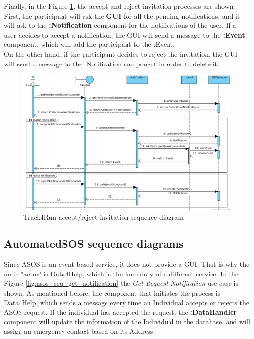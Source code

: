 \documentclass[a4paper, hidelinks, 12pt]{report}
\begin{document}
	Finally, in the Figure \ref{fig:t4r_seq_accept_invitation}, the accept and reject invitation processes are shown. First, the participant will ask the \textbf{GUI} for all the pending notifications, and it will ask to the \textbf{:Notification} component for the notifications of the user. If a user decides to accept a notification, the GUI will send a message to the \textbf{:Event} component, which will add the participant to the :Event.\\

	 On the other hand, if the participant decides to reject the invitation, the GUI will send a message to the :Notification component in order to delete it.\\
	 
	\begin{figure}[H]
		\centering
		\includegraphics[width=1\textwidth]{diagrams/sequence_diagrams/t4r_accept_reject_notification.png}
		\caption[Track4Run accept/reject invitation sequence diagram]{Track4Run accept/reject invitation sequence diagram}
		\label{fig:t4r_seq_accept_invitation}
	\end{figure}	
	
	\subsection{AutomatedSOS sequence diagrams}
	Since ASOS is an event-based service, it does not provide a GUI. That is why the main "actor" is Data4Help, which is the boundary of a different service. In the Figure \ref{fig:asos_seq_get_notification} the \textit{Get Request Notification} use case is shown. As mentioned before, the component that initiates the process is Data4Help, which sends a message every time an Individual accepts or rejects the ASOS request. If the individual has accepted the request, the \textbf{:DataHandler} component will update the information of the Individual in the database, and will assign an emergency contact based on its Address.\\
	
\end{document}
